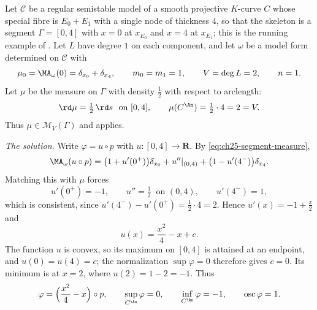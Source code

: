 \begin{example}
\label{ex:ch29-curve-solution}
Let \(\mathcal C\) be a regular semistable model of a smooth projective
\(K\)-curve \(C\) whose special fibre is \(E_0+E_1\) with a single node of
thickness \(4\), so that the skeleton is a segment
\(\Gamma=[0,4]\) with \(x=0\) at \(x_{E_0}\) and \(x=4\) at \(x_{E_1}\);
this is the running example of
.  Let \(L\) have degree \(1\) on each
component, and let \(\omega\) be a model form determined on \(\mathcal C\)
with
\[
 \mu_0=\MA_\omega(0)=\delta_{x_0}+\delta_{x_4},
 \qquad m_0=m_1=1,\qquad V=\deg L=2,\qquad n=1 .
\]
Let \(\mu\) be the measure on \(\Gamma\) with density \(\tfrac12\) with
respect to arclength:
\[
 \rd\mu=\tfrac12\,\rd s\ \text{ on }[0,4],
 \qquad \mu(C^{\An})=\tfrac12\cdot4=2=V .
\]
Thus \(\mu\in\mathcal M_V(\Gamma)\) and 
applies.

\emph{The solution.}  Write \(\varphi=u\circ p\) with
\(u:[0,4]\to\mathbf R\).  By \eqref{eq:ch25-segment-measure},
\[
 \MA_\omega(u\circ p)
 =\bigl(1+u'(0^+)\bigr)\delta_{x_0}
  +u''|_{(0,4)}
  +\bigl(1-u'(4^-)\bigr)\delta_{x_4} .
\]
Matching this with \(\mu\) forces
\[
 u'(0^+)=-1,\qquad u''=\tfrac12\ \text{ on }(0,4),
 \qquad u'(4^-)=1,
\]
which is consistent, since \(u'(4^-)-u'(0^+)=\tfrac12\cdot4=2\).  Hence
\(u'(x)=-1+\tfrac x2\) and
\begin{equation}
\label{eq:ch29-curve-solution}
 u(x)=\frac{x^2}{4}-x+c .
\end{equation}
The function \(u\) is convex, so its maximum on \([0,4]\) is attained at an
endpoint, and \(u(0)=u(4)=c\); the normalization \(\sup\varphi=0\) therefore
gives \(c=0\).  Its minimum is at \(x=2\), where \(u(2)=1-2=-1\).  Thus
\begin{equation}
\label{eq:ch29-curve-solution-values}
 \varphi=\Bigl(\frac{x^2}{4}-x\Bigr)\circ p,
 \qquad \sup_{C^{\An}}\varphi=0,
 \qquad \inf_{C^{\An}}\varphi=-1,
 \qquad \operatorname{osc}\varphi=1 .
\end{equation}


\end{example}
